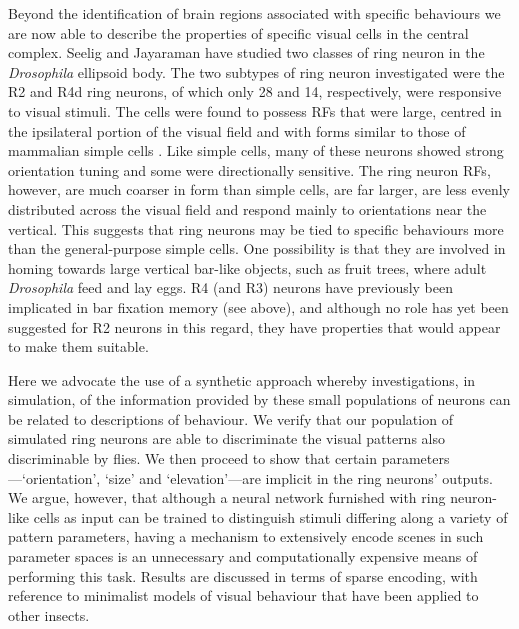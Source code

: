 Beyond the identification of brain regions associated with specific behaviours we are now able to describe the properties of specific visual cells in the central complex. Seelig and Jayaraman \cite{Seelig2013} have studied two classes of ring neuron in the \emph{Drosophila} ellipsoid body.
The two subtypes of ring neuron investigated were the R2 and R4d ring neurons, of which only 28 and 14, respectively, were responsive to visual stimuli.
The cells were found to possess \acp{RF} that were large, centred in the ipsilateral portion of the visual field and with forms similar to those of mammalian simple cells \cite{Hubel1962}.
Like simple cells, many of these neurons showed strong orientation tuning and some were directionally sensitive.
The ring neuron \acp{RF}, however, are much coarser in form than simple cells, are far larger, are less evenly distributed across the visual field and respond mainly to orientations near the vertical.
This suggests that ring neurons may be tied to specific behaviours more than the general-purpose simple cells.
One possibility is that they are involved in homing towards large vertical bar-like objects, such as fruit trees, where adult \emph{Drosophila} feed and lay eggs.
R4 (and R3) neurons have previously been implicated in bar fixation memory (see above), and although no role has yet been suggested for R2 neurons in this regard, they have properties that would appear to make them suitable.

Here we advocate the use of a synthetic approach whereby investigations, in simulation, of the information provided by these small populations of neurons can be related to descriptions of behaviour. We verify that our population of simulated ring neurons are able to discriminate the visual patterns also discriminable by flies.
We then proceed to show that certain parameters---`orientation', `size' and `elevation'---are implicit in the ring neurons' outputs.
We argue, however, that although a neural network furnished with ring neuron-like cells as input can be trained to distinguish stimuli differing along a variety of pattern parameters, having a mechanism to extensively encode scenes in such parameter spaces is an unnecessary and computationally expensive means of performing this task.
Results are discussed in terms of sparse encoding, with reference to minimalist models of visual behaviour that have been applied to other insects.
